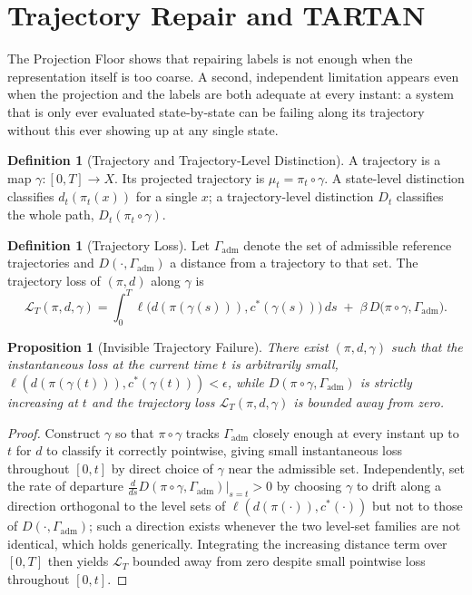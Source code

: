 \documentclass[11pt]{article}
\theoremstyle{plain}
\newtheorem{proposition}[theorem]{Proposition}
\theoremstyle{definition}
\newtheorem{definition}[theorem]{Definition}
\theoremstyle{remark}
\begin{document}
\section{Trajectory Repair and TARTAN}
\label{sec:tartan}

The Projection Floor shows that repairing labels is not enough when the representation itself is too coarse. A second, independent limitation appears even when the projection and the labels are both adequate at every instant: a system that is only ever evaluated state-by-state can be failing along its trajectory without this ever showing up at any single state.

\begin{definition}[Trajectory and Trajectory-Level Distinction]
A trajectory is a map $\gamma : [0,T] \to X$. Its projected trajectory is $\mu_t = \pi_t \circ \gamma$. A state-level distinction classifies $d_t(\pi_t(x))$ for a single $x$; a trajectory-level distinction $D_t$ classifies the whole path, $D_t(\pi_t \circ \gamma)$.
\end{definition}

\begin{definition}[Trajectory Loss]
Let $\Gamma_{\mathrm{adm}}$ denote the set of admissible reference trajectories and $D(\cdot, \Gamma_{\mathrm{adm}})$ a distance from a trajectory to that set. The trajectory loss of $(\pi,d)$ along $\gamma$ is
\[
\mathcal{L}_T(\pi,d,\gamma) = \int_0^T \ell\big(d(\pi(\gamma(s))), c^\ast(\gamma(s))\big)\, ds \;+\; \beta\, D\big(\pi\circ\gamma, \Gamma_{\mathrm{adm}}\big).
\]
\end{definition}

\begin{proposition}[Invisible Trajectory Failure]
\label{prop:invisible}
There exist $(\pi, d, \gamma)$ such that the instantaneous loss at the current time $t$ is arbitrarily small, $\ell(d(\pi(\gamma(t))), c^\ast(\gamma(t))) < \epsilon$, while $D(\pi\circ\gamma,\Gamma_{\mathrm{adm}})$ is strictly increasing at $t$ and the trajectory loss $\mathcal{L}_T(\pi,d,\gamma)$ is bounded away from zero.
\end{proposition}
\begin{proof}
Construct $\gamma$ so that $\pi \circ \gamma$ tracks $\Gamma_{\mathrm{adm}}$ closely enough at every instant up to $t$ for $d$ to classify it correctly pointwise, giving small instantaneous loss throughout $[0,t]$ by direct choice of $\gamma$ near the admissible set. Independently, set the rate of departure $\frac{d}{ds}D(\pi\circ\gamma,\Gamma_{\mathrm{adm}})\big|_{s=t} > 0$ by choosing $\gamma$ to drift along a direction orthogonal to the level sets of $\ell(d(\pi(\cdot)),c^\ast(\cdot))$ but not to those of $D(\cdot,\Gamma_{\mathrm{adm}})$; such a direction exists whenever the two level-set families are not identical, which holds generically. Integrating the increasing distance term over $[0,T]$ then yields $\mathcal{L}_T$ bounded away from zero despite small pointwise loss throughout $[0,t]$.
\end{proof}
\end{document}

